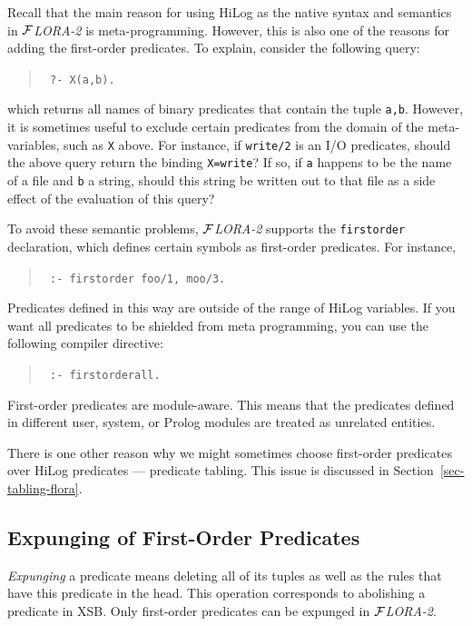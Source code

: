 \documentclass[11pt]{article}
\newcommand{\FLORA}{{\mbox{${\cal F}${\small\it LORA}\rm\emph{-2}}}\xspace}
\begin{document}
Recall that the main reason for using HiLog as the native syntax and
semantics in \FLORA is meta-programming. However, this is also one of the
reasons for adding the first-order predicates. To explain, consider the
following query:
\begin{quote}
 \tt
 ?- X(a,b).
\end{quote}
which returns all names of binary predicates that contain
the tuple {\tt a,b}. However, it is sometimes useful to exclude certain
predicates from the domain of the meta-variables, such as {\tt X} above.
For instance, if {\tt write/2}  is an I/O predicates, should the above
query return the binding {\tt X=write}? If so, if {\tt a} happens to be the
name of a file and {\tt b} a string, should this string be written out to
that file as a side effect of the evaluation of this query?

To avoid these semantic problems, \FLORA supports the {\tt firstorder}
declaration, which defines certain symbols as first-order predicates. For
instance,
\begin{quote}
 \tt
 :- firstorder foo/1, moo/3.
\end{quote}
Predicates defined in this way are outside of the range of HiLog variables.
If you want all predicates to be shielded from meta programming, you can use
the following compiler directive:
\begin{quote}
  \tt
  :- firstorderall.
\end{quote}

First-order predicates are module-aware. This means that the predicates
defined in different user, system, or Prolog modules are treated as
unrelated entities.

There is one other reason why we might sometimes choose first-order
predicates over HiLog predicates --- predicate tabling. This issue
is discussed in Section~\ref{sec-tabling-flora}.



\subsection{Expunging of First-Order Predicates}

\emph{Expunging} a predicate means deleting all of its tuples as well as
the rules that have this predicate in the head. This operation corresponds
to abolishing a predicate in XSB. Only first-order predicates can be
expunged in \FLORA.
\end{document}
